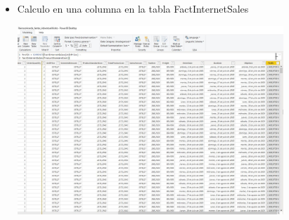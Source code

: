 \begin{itemize}
	\item Calculo en una columna en la tabla FactInternetSales
	\begin{center}
	\includegraphics[width=10cm]{./Imagenes/7} 
	\end{center}
\end{itemize} 